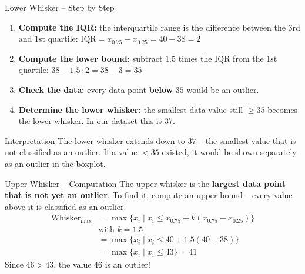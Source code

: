 \documentclass[aspectratio=169,11pt]{beamer}
\begin{document}
\begin{frame}{Lower Whisker -- Step by Step}
  \begin{enumerate}
    \item \textbf{Compute the IQR:} the interquartile range is the difference
      between the 3rd and 1st quartile: $\text{IQR} = x_{0.75} - x_{0.25} = 40 - 38 = 2$
    \item \textbf{Compute the lower bound:} subtract $1.5$ times the IQR from
      the 1st quartile: $38 - 1.5 \cdot 2 = 38 - 3 = 35$
    \item \textbf{Check the data:} every data point \textbf{below} $35$
      would be an outlier.
    \item \textbf{Determine the lower whisker:} the smallest data value still
      $\ge 35$ becomes the lower whisker. In our dataset this is $37$.
  \end{enumerate}
  \vspace{0.3cm}
  \begin{alertblock}{Interpretation}
    The lower whisker extends down to $37$ -- the smallest value that is not classified as an outlier.
    If a value $< 35$ existed, it would be shown separately as an outlier in the boxplot.
  \end{alertblock}
\end{frame}

\begin{frame}{Upper Whisker -- Computation}
  The upper whisker is the \textbf{largest data point that is not yet an outlier}.
  To find it, compute an upper bound -- every value above it is classified as an outlier.
  \begin{align*}
    \text{Whisker}_{\max} &= \max\{x_i \mid x_i \le x_{0.75} + k(x_{0.75} - x_{0.25})\} \\
    &\text{with } k = 1.5 \\
    &= \max\{x_i \mid x_i \le 40 + 1.5(40 - 38)\} \\
    &= \max\{x_i \mid x_i \le 43\} = 41
  \end{align*}
  Since $46 > 43$, the value $46$ is an outlier!
\end{frame}
\end{document}
